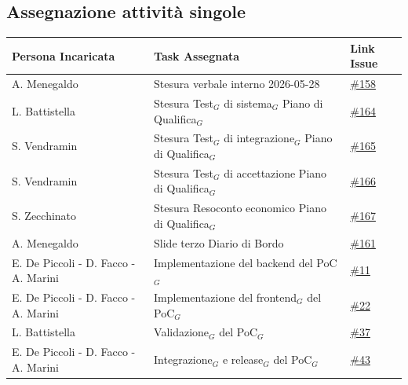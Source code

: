 \documentclass[a4paper, 10pt, colorlinks=true, linkcolor=black, urlcolor=blue, citecolor=blue, hidelinks]{article}
\newcommand{\issueDoc}[1]{\href{https://github.com/thebitless-group-swe/thebitless.github.io/issues/#1}{\##1}}
\newcommand{\issuePoC}[1]{\href{https://github.com/thebitless-group-swe/PoC/issues/#1}{\##1}}
\begin{document}
\subsection{Assegnazione attività singole}
\begin{center}
    \renewcommand{\arraystretch}{1.4}
        \begin{tabular}{|p{4.2cm}|p{6.2cm}|p{2.2cm}|}
        \hline
        \textbf{Persona Incaricata} & \textbf{Task Assegnata} & \centering\textbf{Link Issue} \tabularnewline
        \hline
        A. Menegaldo & Stesura verbale interno 2026-05-28 & \issueDoc{158} \\
        \hline
        L. Battistella & Stesura Test$_G$ di sistema$_G$ Piano di Qualifica$_G$ & \issueDoc{164} \\
        \hline
        S. Vendramin & Stesura Test$_G$ di integrazione$_G$ Piano di Qualifica$_G$ & \issueDoc{165} \\
        \hline
        S. Vendramin & Stesura Test$_G$ di accettazione Piano di Qualifica$_G$ & \issueDoc{166} \\
        \hline
        S. Zecchinato & Stesura Resoconto economico Piano di Qualifica$_G$ & \issueDoc{167} \\
        \hline
        A. Menegaldo & Slide terzo Diario di Bordo & \issueDoc{161} \\
        \hline
        E. De Piccoli - D. Facco - A. Marini & Implementazione del backend del PoC$_G$ & \issuePoC{11} \\
        \hline
        E. De Piccoli - D. Facco - A. Marini & Implementazione del frontend$_G$ del PoC$_G$ & \issuePoC{22} \\
        \hline
        L. Battistella & Validazione$_G$ del PoC$_G$ & \issuePoC{37} \\
        \hline
        E. De Piccoli - D. Facco - A. Marini & Integrazione$_G$ e release$_G$ del PoC$_G$ & \issuePoC{43} \\
        \hline
    \end{tabular}
\end{center}

\appendix
\end{document}
